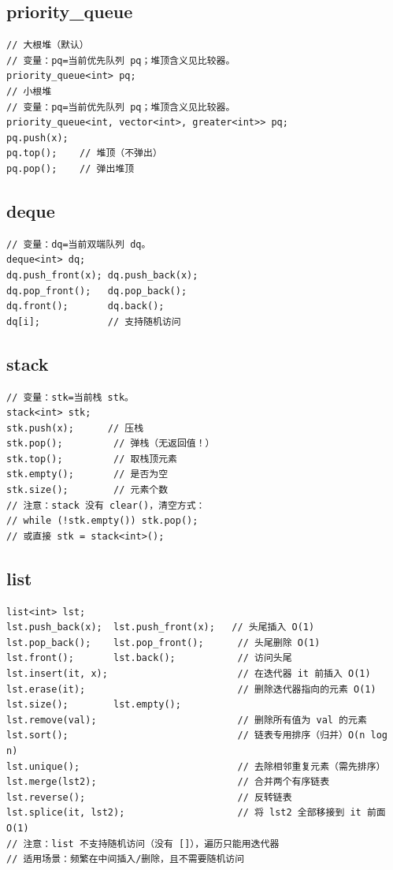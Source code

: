 \documentclass[UTF8,openany,oneside,zihao=-4]{ctexbook}
\begin{document}
\subsection{priority\_queue}
\begin{lstlisting}
// 大根堆（默认）
// 变量：pq=当前优先队列 pq；堆顶含义见比较器。
priority_queue<int> pq;
// 小根堆
// 变量：pq=当前优先队列 pq；堆顶含义见比较器。
priority_queue<int, vector<int>, greater<int>> pq;
pq.push(x);
pq.top();    // 堆顶（不弹出）
pq.pop();    // 弹出堆顶
\end{lstlisting}

\subsection{deque}
\begin{lstlisting}
// 变量：dq=当前双端队列 dq。
deque<int> dq;
dq.push_front(x); dq.push_back(x);
dq.pop_front();   dq.pop_back();
dq.front();       dq.back();
dq[i];            // 支持随机访问
\end{lstlisting}

\subsection{stack}
\begin{lstlisting}
// 变量：stk=当前栈 stk。
stack<int> stk;
stk.push(x);      // 压栈
stk.pop();         // 弹栈（无返回值！）
stk.top();         // 取栈顶元素
stk.empty();       // 是否为空
stk.size();        // 元素个数
// 注意：stack 没有 clear()，清空方式：
// while (!stk.empty()) stk.pop();
// 或直接 stk = stack<int>();
\end{lstlisting}

\subsection{list}
\begin{lstlisting}
list<int> lst;
lst.push_back(x);  lst.push_front(x);   // 头尾插入 O(1)
lst.pop_back();    lst.pop_front();      // 头尾删除 O(1)
lst.front();       lst.back();           // 访问头尾
lst.insert(it, x);                       // 在迭代器 it 前插入 O(1)
lst.erase(it);                           // 删除迭代器指向的元素 O(1)
lst.size();        lst.empty();
lst.remove(val);                         // 删除所有值为 val 的元素
lst.sort();                              // 链表专用排序（归并）O(n log n)
lst.unique();                            // 去除相邻重复元素（需先排序）
lst.merge(lst2);                         // 合并两个有序链表
lst.reverse();                           // 反转链表
lst.splice(it, lst2);                    // 将 lst2 全部移接到 it 前面 O(1)
// 注意：list 不支持随机访问（没有 []），遍历只能用迭代器
// 适用场景：频繁在中间插入/删除，且不需要随机访问
\end{lstlisting}
\end{document}
